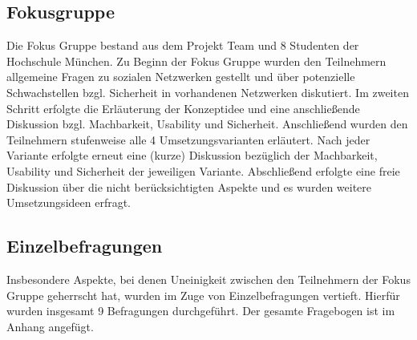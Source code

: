 \documentclass{sigchi}
\begin{document}
\subsection{Fokusgruppe}
\label{Fokusgruppe}
Die Fokus Gruppe bestand aus dem Projekt Team und 8 Studenten der Hochschule München. Zu Beginn der Fokus Gruppe wurden den Teilnehmern allgemeine Fragen zu sozialen Netzwerken gestellt und über potenzielle Schwachstellen bzgl. Sicherheit in vorhandenen Netzwerken diskutiert. Im zweiten Schritt erfolgte die Erläuterung der Konzeptidee und eine anschließende Diskussion bzgl. Machbarkeit, Usability und Sicherheit. Anschließend wurden den Teilnehmern stufenweise alle 4 Umsetzungsvarianten erläutert. Nach jeder Variante erfolgte erneut eine (kurze) Diskussion bezüglich der Machbarkeit, Usability und Sicherheit der jeweiligen Variante. Abschließend erfolgte eine freie Diskussion über die nicht berücksichtigten Aspekte und es wurden weitere Umsetzungsideen erfragt.
 
\subsection{Einzelbefragungen}
\label{Einzelbefragung}
Insbesondere Aspekte, bei denen Uneinigkeit zwischen den Teilnehmern der Fokus Gruppe geherrscht hat, wurden im Zuge von Einzelbefragungen vertieft. Hierfür wurden insgesamt 9 Befragungen durchgeführt. Der gesamte Fragebogen ist im Anhang angefügt. 
\end{document}
